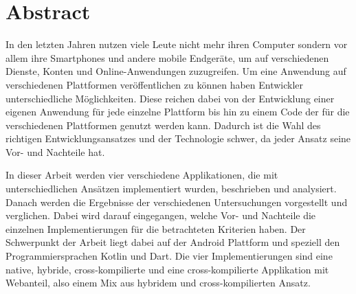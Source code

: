 \chapter*{Abstract}

\bigskip 

In den letzten Jahren nutzen viele Leute nicht mehr ihren Computer sondern vor allem ihre Smartphones und andere mobile Endgeräte, um auf verschiedenen Dienste, Konten und Online-Anwendungen zuzugreifen. Um eine Anwendung auf verschiedenen Plattformen veröffentlichen zu können haben Entwickler unterschiedliche Möglichkeiten. Diese reichen dabei von der Entwicklung einer eigenen Anwendung für jede einzelne Plattform bis hin zu einem Code der für die verschiedenen Plattformen genutzt werden kann. Dadurch ist die Wahl des richtigen Entwicklungsansatzes und der Technologie schwer, da jeder Ansatz seine Vor- und Nachteile hat. 

In dieser Arbeit werden vier verschiedene Applikationen, die mit unterschiedlichen Ansätzen implementiert wurden, beschrieben und analysiert. Danach werden die Ergebnisse der verschiedenen Untersuchungen vorgestellt und verglichen. Dabei wird darauf eingegangen, welche Vor- und Nachteile die einzelnen Implementierungen für die betrachteten Kriterien haben. Der Schwerpunkt der Arbeit liegt dabei auf der Android Plattform und speziell den Programmiersprachen Kotlin und Dart. Die vier Implementierungen sind eine native, hybride, cross-kompilierte und eine cross-kompilierte Applikation mit Webanteil, also einem Mix aus hybridem und cross-kompilierten Ansatz.